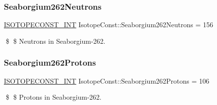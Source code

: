 \subsubsection{\texorpdfstring{Seaborgium262\+Neutrons}{Seaborgium262Neutrons}}
{\footnotesize\ttfamily \mbox{\hyperlink{group___isotope_const-_macros_ga5f18360b3e99483a35c32d789e62621c}{I\+S\+O\+T\+O\+P\+E\+C\+O\+N\+S\+T\+\_\+\+I\+NT}} Isotope\+Const\+::\+Seaborgium262\+Neutrons = 156}

\$ \$ Neutrons in Seaborgium-\/262. \mbox{\label{group___isotope_const-_seaborgium-_sg262_ga942ecfa622f909b8076a6a10569787eb}} 
\subsubsection{\texorpdfstring{Seaborgium262\+Protons}{Seaborgium262Protons}}
{\footnotesize\ttfamily \mbox{\hyperlink{group___isotope_const-_macros_ga5f18360b3e99483a35c32d789e62621c}{I\+S\+O\+T\+O\+P\+E\+C\+O\+N\+S\+T\+\_\+\+I\+NT}} Isotope\+Const\+::\+Seaborgium262\+Protons = 106}

\$ \$ Protons in Seaborgium-\/262. 